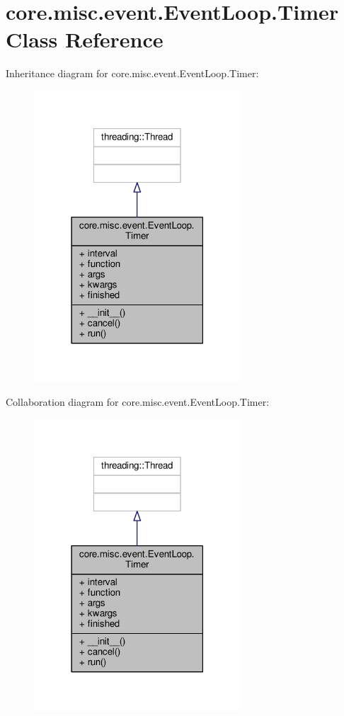 \hypertarget{classcore_1_1misc_1_1event_1_1_event_loop_1_1_timer}{\section{core.\+misc.\+event.\+Event\+Loop.\+Timer Class Reference}
\label{classcore_1_1misc_1_1event_1_1_event_loop_1_1_timer}
}


Inheritance diagram for core.\+misc.\+event.\+Event\+Loop.\+Timer\+:
\nopagebreak
\begin{figure}[H]
\begin{center}
\leavevmode
\includegraphics[width=219pt]{classcore_1_1misc_1_1event_1_1_event_loop_1_1_timer__inherit__graph}
\end{center}
\end{figure}


Collaboration diagram for core.\+misc.\+event.\+Event\+Loop.\+Timer\+:
\nopagebreak
\begin{figure}[H]
\begin{center}
\leavevmode
\includegraphics[width=219pt]{classcore_1_1misc_1_1event_1_1_event_loop_1_1_timer__coll__graph}
\end{center}
\end{figure}
